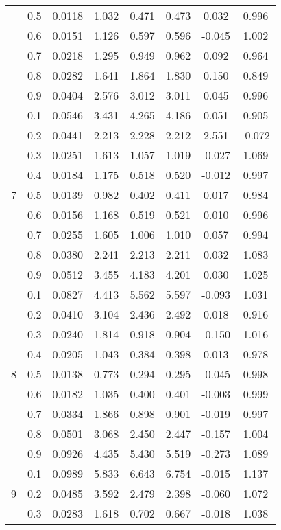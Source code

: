 \documentclass[11pt,a4paper]{report}
\begin{document}
\begin{longtable}{ | c | c || c | c | c | c | c | c | }
 & 0.5 & 0.0118 & 1.032 & 0.471 & 0.473 & 0.032 & 0.996 \\
 & 0.6 & 0.0151 & 1.126 & 0.597 & 0.596 & -0.045 & 1.002 \\
 & 0.7 & 0.0218 & 1.295 & 0.949 & 0.962 & 0.092 & 0.964 \\
 & 0.8 & 0.0282 & 1.641 & 1.864 & 1.830 & 0.150 & 0.849 \\
 & 0.9 & 0.0404 & 2.576 & 3.012 & 3.011 & 0.045 & 0.996 \\
 \hline
\multirow{9}{*}{7} & 0.1 & 0.0546 & 3.431 & 4.265 & 4.186 & 0.051 & 0.905 \\
 & 0.2 & 0.0441 & 2.213 & 2.228 & 2.212 & 2.551 & -0.072 \\
 & 0.3 & 0.0251 & 1.613 & 1.057 & 1.019 & -0.027 & 1.069 \\
 & 0.4 & 0.0184 & 1.175 & 0.518 & 0.520 & -0.012 & 0.997 \\
 & 0.5 & 0.0139 & 0.982 & 0.402 & 0.411 & 0.017 & 0.984 \\
 & 0.6 & 0.0156 & 1.168 & 0.519 & 0.521 & 0.010 & 0.996 \\
 & 0.7 & 0.0255 & 1.605 & 1.006 & 1.010 & 0.057 & 0.994 \\
 & 0.8 & 0.0380 & 2.241 & 2.213 & 2.211 & 0.032 & 1.083 \\
 & 0.9 & 0.0512 & 3.455 & 4.183 & 4.201 & 0.030 & 1.025 \\
 \hline
\multirow{9}{*}{8} & 0.1 & 0.0827 & 4.413 & 5.562 & 5.597 & -0.093 & 1.031 \\
 & 0.2 & 0.0410 & 3.104 & 2.436 & 2.492 & 0.018 & 0.916 \\
 & 0.3 & 0.0240 & 1.814 & 0.918 & 0.904 & -0.150 & 1.016 \\
 & 0.4 & 0.0205 & 1.043 & 0.384 & 0.398 & 0.013 & 0.978 \\
 & 0.5 & 0.0138 & 0.773 & 0.294 & 0.295 & -0.045 & 0.998 \\
 & 0.6 & 0.0182 & 1.035 & 0.400 & 0.401 & -0.003 & 0.999 \\
 & 0.7 & 0.0334 & 1.866 & 0.898 & 0.901 & -0.019 & 0.997 \\
 & 0.8 & 0.0501 & 3.068 & 2.450 & 2.447 & -0.157 & 1.004 \\
 & 0.9 & 0.0926 & 4.435 & 5.430 & 5.519 & -0.273 & 1.089 \\
 \hline
\multirow{9}{*}{9} & 0.1 & 0.0989 & 5.833 & 6.643 & 6.754 & -0.015 & 1.137 \\
 & 0.2 & 0.0485 & 3.592 & 2.479 & 2.398 & -0.060 & 1.072 \\
 & 0.3 & 0.0283 & 1.618 & 0.702 & 0.667 & -0.018 & 1.038 \\

\end{longtable}
\end{document}
